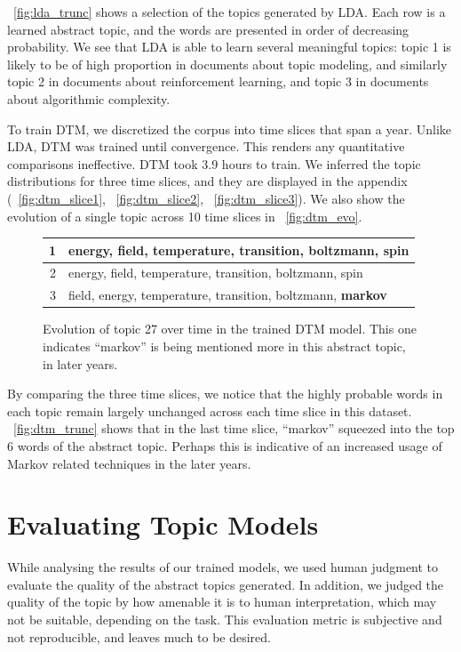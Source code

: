 \documentclass[letterpaper]{article}
\begin{document}
~\autoref{fig:lda_trunc} shows a selection of the topics generated by
LDA. Each row is a learned abstract topic, and the words are presented
in order of decreasing probability. We see that LDA is able to learn
several meaningful topics: topic 1 is likely to be of high proportion
in documents about topic modeling, and similarly topic 2 in documents
about reinforcement learning, and topic 3 in documents about
algorithmic complexity.

To train DTM, we discretized the corpus into time slices that span a
year. Unlike LDA, DTM was trained until convergence. This renders any
quantitative comparisons ineffective. DTM took 3.9 hours to train. We
inferred the topic distributions for three time slices, and they are
displayed in the appendix (~\autoref{fig:dtm_slice1},
~\autoref{fig:dtm_slice2}, ~\autoref{fig:dtm_slice3}). We also show
the evolution of a single topic across 10 time slices in
~\autoref{fig:dtm_evo}.

\begin{figure}[ht]
  \begin{tabularx}{\linewidth}{|r | X|}
    \hline
    1 & energy, field, temperature, transition, boltzmann, spin \\ \hline
    2 & energy, field, temperature, transition, boltzmann, spin \\ \hline
    3 & field, energy, temperature, transition, boltzmann, \bf{markov}
    \\ \hline
    
  \end{tabularx}
  \caption{\label{fig:dtm_trunc} Evolution of topic 27 over time in
    the trained DTM model. This one indicates ``markov'' is being
    mentioned more in this abstract topic, in later years. }
\end{figure}

By comparing the three time slices, we notice that the highly probable
words in each topic remain largely unchanged across each time slice in
this dataset. ~\autoref{fig:dtm_trunc} shows that in the last time
slice, ``markov'' squeezed into the top 6 words of the abstract topic.
Perhaps this is indicative of an increased usage of Markov related
techniques in the later years.

\section{Evaluating Topic Models}
\label{sec:evaluation}
While analysing the results of our trained models, we used human
judgment to evaluate the quality of the abstract topics generated. In
addition, we judged the quality of the topic by how amenable it is to
human interpretation, which may not be suitable, depending on the
task. This evaluation metric is subjective and not reproducible, and
leaves much to be desired.
\end{document}
